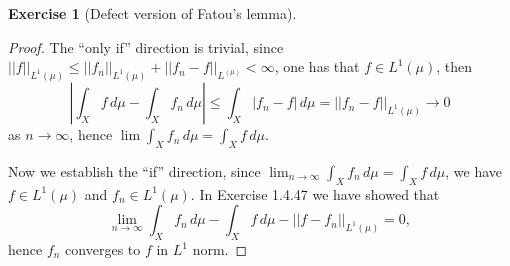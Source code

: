 \documentclass[a4paper]{article}
\newtheorem{ex}{Exercise}[subsection]
\begin{document}
\setcounter{ex}{16}\begin{ex}[Defect version of Fatou’s lemma]\end{ex}\begin{proof}
The ``only if'' direction is trivial, since $||f||_{L^1(\mu)} \leq ||f_n||_{L^1(\mu)} + ||f_n - f||_{L^(\mu)} < \infty$,
one has that $f \in L^1(\mu)$, then $$
|\int_X f\,d\mu - \int_X f_n \,d\mu| \leq \int_X |f_n - f|\,d\mu = ||f_n - f||_{L^1(\mu)} \to 0
$$as $n \to \infty$, hence $\lim \int_X f_n\,d\mu = \int_X f\,d\mu$.

Now we establish the ``if'' direction, since $\lim_{n \to \infty} \int_X f_n\,d\mu = \int_X f\,d\mu$, we have 
$f \in L^1(\mu)$ and $f_n \in L^1(\mu)$. In Exercise 1.4.47 we have showed that $$
\lim_{n \to \infty} \int_X f_n\,d\mu - \int_X f\,d\mu - ||f - f_n||_{L^1(\mu)} = 0,
$$hence $f_n$ converges to $f$ in $L^1$ norm.
\end{proof}
\end{document}
